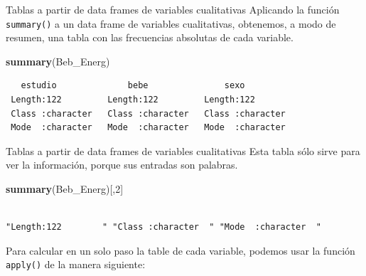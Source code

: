 \documentclass[
  ignorenonframetext,
]{beamer}
\newenvironment{Shaded}{\begin{snugshade}}{\end{snugshade}}
\newcommand{\DecValTok}[1]{\textcolor[rgb]{0.00,0.00,0.81}{#1}}
\newcommand{\FunctionTok}[1]{\textcolor[rgb]{0.13,0.29,0.53}{\textbf{#1}}}
\newcommand{\NormalTok}[1]{#1}
\begin{document}
\begin{frame}[fragile]{Tablas a partir de data frames de variables
cualitativas}
\label{tablas-a-partir-de-data-frames-de-variables-cualitativas-3}
Aplicando la función \texttt{summary()} a un data frame de variables
cualitativas, obtenemos, a modo de resumen, una tabla con las
frecuencias absolutas de cada variable.

\begin{Shaded}
\begin{Highlighting}[]
\FunctionTok{summary}\NormalTok{(Beb\_Energ)}
\end{Highlighting}
\end{Shaded}

\begin{verbatim}
   estudio              bebe               sexo          
 Length:122         Length:122         Length:122        
 Class :character   Class :character   Class :character  
 Mode  :character   Mode  :character   Mode  :character  
\end{verbatim}
\end{frame}

\begin{frame}[fragile]{Tablas a partir de data frames de variables
cualitativas}
\label{tablas-a-partir-de-data-frames-de-variables-cualitativas-4}
Esta tabla sólo sirve para ver la información, porque sus entradas son
palabras.

\begin{Shaded}
\begin{Highlighting}[]
\FunctionTok{summary}\NormalTok{(Beb\_Energ)[,}\DecValTok{2}\NormalTok{]}
\end{Highlighting}
\end{Shaded}

\begin{verbatim}
                                                               
"Length:122        " "Class :character  " "Mode  :character  " 
\end{verbatim}

Para calcular en un solo paso la table de cada variable, podemos usar la
función \texttt{apply()} de la manera siguiente:
\end{frame}
\end{document}

